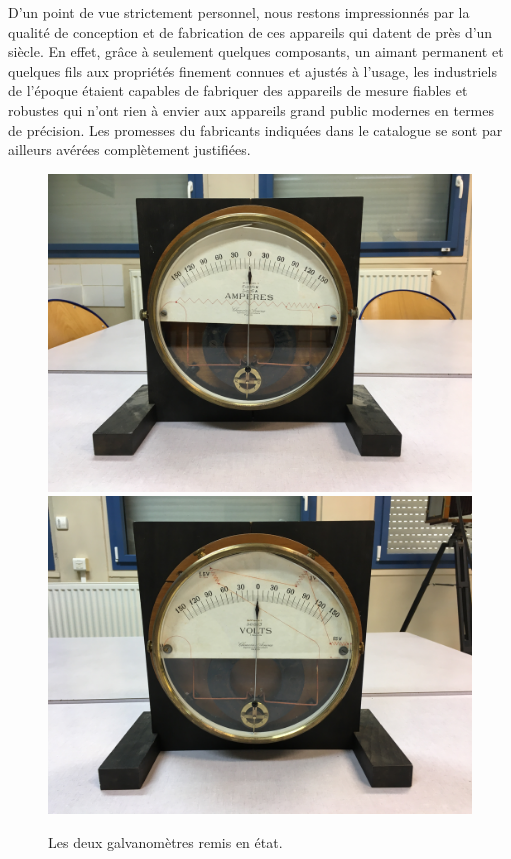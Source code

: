 \documentclass[12pt,a4paper,fleqn]{article}
\begin{document}
D'un point de vue strictement personnel, nous restons impressionnés par la qualité de conception et de fabrication de ces appareils qui datent de près d'un siècle.
En effet, grâce à seulement quelques composants, un aimant permanent et quelques fils aux propriétés finement connues et ajustés à l'usage, les industriels de l'époque étaient capables de fabriquer des appareils de mesure fiables et robustes qui n'ont rien à envier aux appareils grand public modernes en termes de précision.
Les promesses du fabricants indiquées dans le catalogue se sont par ailleurs avérées complètement justifiées.

\begin{figure}[htbp]
    \center
    \begin{multicols}{2}
    \includegraphics[width=\linewidth, trim=400 300 600 200, clip]{images/IMG_4045.JPG}
    \includegraphics[width=\linewidth, trim=500 300 500 200, clip]{images/IMG_4047.JPG}
    \end{multicols}
    \caption{Les deux galvanomètres remis en état.}
\end{figure}
\end{document}
